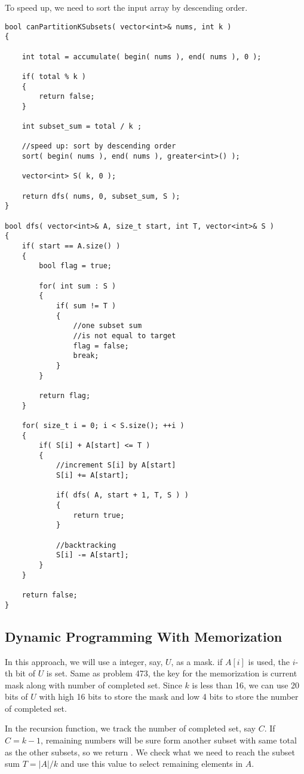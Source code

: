 To speed up, we need to sort the input array by descending order.
\setcounter{lstlisting}{0}
\begin{lstlisting}[style=customc, caption={Recursion}]
bool canPartitionKSubsets( vector<int>& nums, int k )
{

    int total = accumulate( begin( nums ), end( nums ), 0 );

    if( total % k )
    {
        return false;
    }

    int subset_sum = total / k ;

    //speed up: sort by descending order
    sort( begin( nums ), end( nums ), greater<int>() );

    vector<int> S( k, 0 );

    return dfs( nums, 0, subset_sum, S );
}

bool dfs( vector<int>& A, size_t start, int T, vector<int>& S )
{
    if( start == A.size() )
    {
        bool flag = true;

        for( int sum : S )
        {
            if( sum != T )
            {
                //one subset sum
                //is not equal to target
                flag = false;
                break;
            }
        }

        return flag;
    }

    for( size_t i = 0; i < S.size(); ++i )
    {
        if( S[i] + A[start] <= T )
        {
            //increment S[i] by A[start]
            S[i] += A[start];

            if( dfs( A, start + 1, T, S ) )
            {
                return true;
            }

            //backtracking
            S[i] -= A[start];
        }
    }

    return false;
}
\end{lstlisting}

\subsection{Dynamic Programming With Memorization}
In this approach, we will use a integer, say, $U$, as a mask. if $A[i]$ is used, the $i$-th bit of $U$ is set. Same as problem 473, the key for the memorization is current mask along with number of completed set. Since $k$ is less than 16, we can use 20 bits of $U$ with high 16 bits to store the mask and low 4 bits to store the number of completed set.

In the recursion function, we track the number of completed set, say $C$. If $C=k-1$, remaining numbers will be sure form another subset with same total as the other subsets, so we return . We check what we need to reach the subset sum $T = \lvert A\rvert / k $ and use this value to select remaining elements in $A$.  

